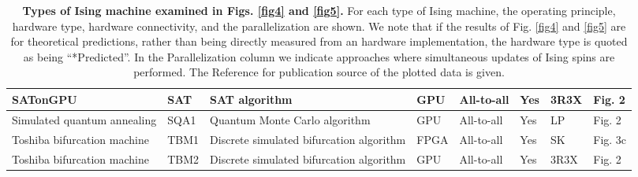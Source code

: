 \documentclass[fleqn,10pt]{wlscirep}
\def\change#1{#1}
\begin{document}
\begin{table}
{\begin{tabular}{|l|l|l|l|l|l|l|l|}
   \hline
SATonGPU    & SAT &  SAT algorithm & GPU & All-to-all &  Yes  &  3R3X & Fig. 2 \cite{kowalsky20213} \\
   \hline
      Simulated quantum annealing & SQA1 & Quantum Monte Carlo algorithm  &  GPU & All-to-all & Yes   &  LP &  Fig. 2  \cite{albash2018demonstration} \\
    \hline
  Toshiba bifurcation machine & TBM1 &  \change{Discrete simulated bifurcation algorithm} &  FPGA & All-to-all &  Yes &  SK & Fig. 3c \cite{goto2021high} \\
  \hline 
  \change{Toshiba bifurcation machine} & TBM2  & \change{Discrete simulated bifurcation algorithm}   &  GPU & All-to-all &  Yes &  3R3X & Fig. 2 \cite{kowalsky20213} \\
   \hline
  \end{tabular}}
\caption{{\bf Types of Ising machine examined in Figs. \ref{fig4} and \ref{fig5}.  }  For each type of Ising machine, the operating principle, hardware type, hardware connectivity, and the parallelization are shown.  \change{We note that if the results of Fig. \ref{fig4} and \ref{fig5} are for theoretical predictions, rather than being directly measured from an hardware implementation, the hardware type is quoted as being ``*Predicted''. }   \change{In the Parallelization column we indicate approaches where simultaneous updates of Ising spins are performed. The Reference for publication source of the plotted data is given.  }  %
\label{table1}
}
\end{table}
\end{document}
